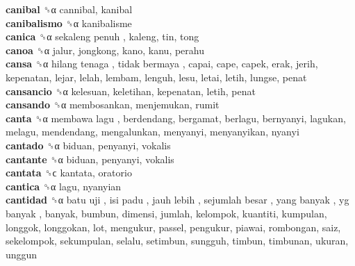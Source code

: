 \textbf{canibal} ␝α  cannibal, kanibal  \\
\textbf{canibalismo} ␝α  kanibalisme  \\
\textbf{canica} ␝α   sekaleng penuh , kaleng, tin, tong  \\
\textbf{canoa} ␝α  jalur, jongkong, kano, kanu, perahu  \\
\textbf{cansa} ␝α   hilang tenaga ,  tidak bermaya , capai, cape, capek, erak, jerih, kepenatan, lejar, lelah, lembam, lenguh, lesu, letai, letih, lungse, penat  \\
\textbf{cansancio} ␝α  kelesuan, keletihan, kepenatan, letih, penat  \\
\textbf{cansando} ␝α  membosankan, menjemukan, rumit  \\
\textbf{canta} ␝α   membawa lagu , berdendang, bergamat, berlagu, bernyanyi, lagukan, melagu, mendendang, mengalunkan, menyanyi, menyanyikan, nyanyi  \\
\textbf{cantado} ␝α  biduan, penyanyi, vokalis  \\
\textbf{cantante} ␝α  biduan, penyanyi, vokalis  \\
\textbf{cantata} ␝ϲ  kantata, oratorio  \\
\textbf{cantica} ␝α  lagu, nyanyian  \\
\textbf{cantidad} ␝α   batu uji ,  isi padu ,  jauh lebih ,  sejumlah besar ,  yang banyak ,  yg banyak , banyak, bumbun, dimensi, jumlah, kelompok, kuantiti, kumpulan, longgok, longgokan, lot, mengukur, passel, pengukur, piawai, rombongan, saiz, sekelompok, sekumpulan, selalu, setimbun, sungguh, timbun, timbunan, ukuran, unggun  \\

